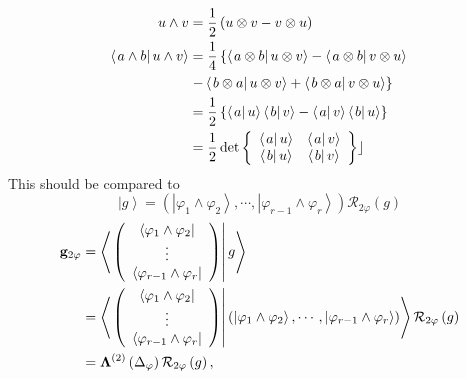 \documentclass[aps,preprint]{revtex4}%
\begin{document}
\begin{align}
u\wedge v  &  =\frac{1}{2}\left(  u\otimes v-v\otimes u\right) \\
\left\langle \left.  a\wedge b\right\vert u\wedge v\right\rangle  &  =\frac
{1}{4}\left\{  \left\langle \left.  a\otimes b\right\vert u\otimes
v\right\rangle -\left\langle \left.  a\otimes b\right\vert v\otimes
u\right\rangle \right. \\
&  \left.  -\left\langle \left.  b\otimes a\right\vert u\otimes v\right\rangle
+\left\langle \left.  b\otimes a\right\vert v\otimes u\right\rangle \right\}
\\
&  =\frac{1}{2}\left\{  \left\langle \left.  a\right\vert u\right\rangle
\left\langle \left.  b\right\vert v\right\rangle -\left\langle \left.
a\right\vert v\right\rangle \left\langle \left.  b\right\vert u\right\rangle
\right\} \\
&  =\frac{1}{2}\det\left\{
\begin{array}
[c]{cc}%
\left\langle \left.  a\right\vert u\right\rangle  & \left\langle \left.
a\right\vert v\right\rangle \\
\left\langle \left.  b\right\vert u\right\rangle  & \left\langle \left.
b\right\vert v\right\rangle
\end{array}
\right\}  \rfloor
\end{align}
This should be compared to
\begin{equation}
\left\vert g\right\rangle =\left(  \left\vert \varphi_{1}\wedge\varphi
_{2}\right\rangle ,\cdots,\left\vert \varphi_{r-1}\wedge\varphi_{r}%
\right\rangle \right)  \mathcal{R}_{2\varphi}\left(  g\right)
\end{equation}%
\begin{align}
\mathbf{g}_{2\varphi}  &  =\left\langle \left.  \left(
\begin{array}
[c]{c}%
\left\langle \varphi_{1}\wedge\varphi_{2}\right\vert \\
\vdots\\
\left\langle \varphi_{r-1}\wedge\varphi_{r}\right\vert
\end{array}
\right)  \right\vert g\right\rangle \\
&  =\left\langle \left.  \left(
\begin{array}
[c]{c}%
\left\langle \varphi_{1}\wedge\varphi_{2}\right\vert \\
\vdots\\
\left\langle \varphi_{r-1}\wedge\varphi_{r}\right\vert
\end{array}
\right)  \right\vert \left(  \left\vert \varphi_{1}\wedge\varphi
_{2}\right\rangle ,\cdots,\left\vert \varphi_{r-1}\wedge\varphi_{r}%
\right\rangle \right)  \right\rangle \mathcal{R}_{2\varphi}\left(  g\right) \\
&  =\mathbf{\Lambda}^{\left(  2\right)  }\left(  \Delta_{\varphi}\right)
\mathcal{R}_{2\varphi}\left(  g\right)  ,
\end{align}
\end{document}
